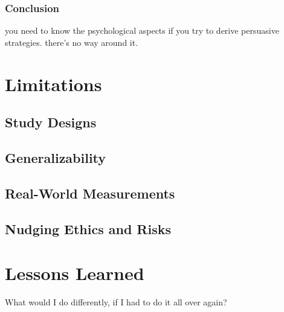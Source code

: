 \subsubsection{Conclusion}
you need to know the psychological aspects if you try to derive persuasive strategies. there's no way around it. 


\section{Limitations}

\subsection{Study Designs}

\subsection{Generalizability}

\subsection{Real-World Measurements}

\subsection{Nudging Ethics and Risks}




\section{Lessons Learned}
What would I do differently, if I had to do it all over again?



